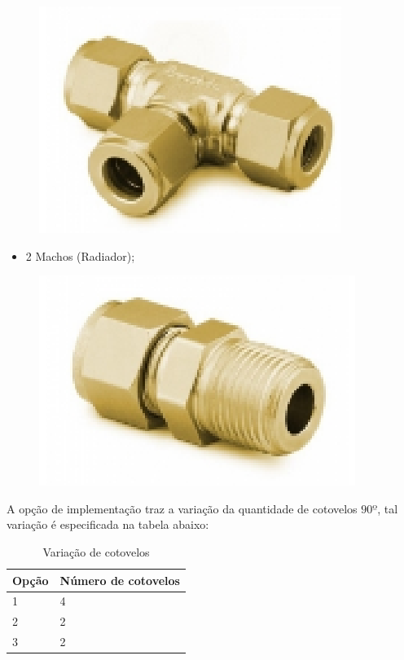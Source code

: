 \begin{figure}[!htb]                                                               
   \centering                                                                      
   \includegraphics[scale=0.6, keepaspectratio=true]{figuras/peca2.eps} 
\end{figure}\begin{itemize}

\newpage
\item 2 Machos (Radiador);
\end{itemize}

\begin{figure}[!htb]                                                               
   \centering                                                                      
   \includegraphics[scale=0.6, keepaspectratio=true]{figuras/peca3.eps} 
\end{figure}

A opção de implementação traz a variação da quantidade de cotovelos $90º$, tal variação é especificada na tabela abaixo:

\begin{table}[!h]
\centering
\begin{tabular}{|p{3cm}|p{5cm}|}
\hline
Opção & Número de cotovelos\\
\hline
1 & 4 \\ \hline
2 & 2 \\ \hline
3 & 2 \\
\hline
\end{tabular}
\caption{Variação de cotovelos}
\end{table}

